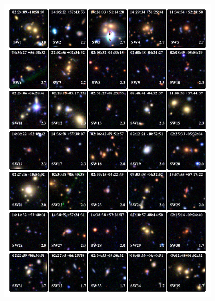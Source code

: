 \documentclass[useAMS,usenatbib,a4paper]{mn2e}
\begin{document}


\begin{figure}
\begin{center}
\includegraphics[scale=1.9]{sw-cfhtls-figs/lenscandfin.pdf}
\end{center}
\end{figure}
\end{document}
